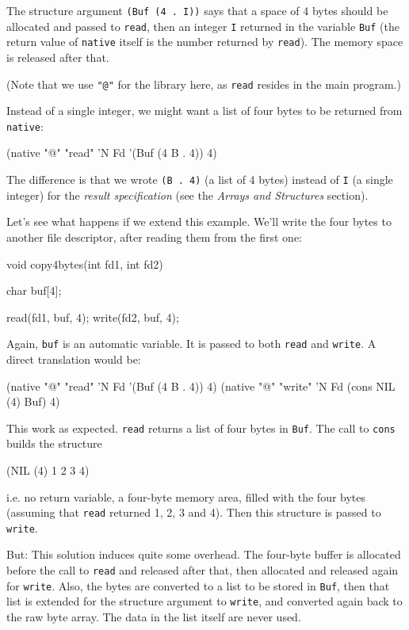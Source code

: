 The structure argument \texttt{(Buf (4 . I))} says that a space of 4
bytes should be allocated and passed to \texttt{read}, then an integer
\texttt{I} returned in the variable \texttt{Buf} (the return value of
\texttt{native} itself is the number returned by \texttt{read}). The
memory space is released after that.

(Note that we use \texttt{"@"} for the library here, as \texttt{read}
resides in the main program.)

Instead of a single integer, we might want a list of four bytes to be
returned from \texttt{native}:

\begin{wideverbatim}
(native "@" "read" 'N Fd '(Buf (4 B . 4)) 4)
\end{wideverbatim}

The difference is that we wrote \texttt{(B . 4)} (a list of 4 bytes)
instead of \texttt{I} (a single integer) for the \emph{result
  specification} (see the \emph{Arrays and Structures} section).

Let's see what happens if we extend this example. We'll write the four
bytes to another file descriptor, after reading them from the first one:

\begin{wideverbatim}
void copy4bytes(int fd1, int fd2) {
   char buf[4];

   read(fd1, buf, 4);
   write(fd2, buf, 4);
}
\end{wideverbatim}

Again, \texttt{buf} is an automatic variable. It is passed to both
\texttt{read} and \texttt{write}. A direct translation would be:

\begin{wideverbatim}
(native "@" "read" 'N Fd '(Buf (4 B . 4)) 4)
(native "@" "write" 'N Fd (cons NIL (4) Buf) 4)
\end{wideverbatim}

This work as expected. \texttt{read} returns a list of four bytes in
\texttt{Buf}. The call to \texttt{cons} builds the structure

\begin{wideverbatim}
(NIL (4) 1 2 3 4)
\end{wideverbatim}

i.e. no return variable, a four-byte memory area, filled with the four
bytes (assuming that \texttt{read} returned 1, 2, 3 and 4). Then this
structure is passed to \texttt{write}.

But: This solution induces quite some overhead. The four-byte buffer is
allocated before the call to \texttt{read} and released after that, then
allocated and released again for \texttt{write}. Also, the bytes are
converted to a list to be stored in \texttt{Buf}, then that list is
extended for the structure argument to \texttt{write}, and converted
again back to the raw byte array. The data in the list itself are never
used.

